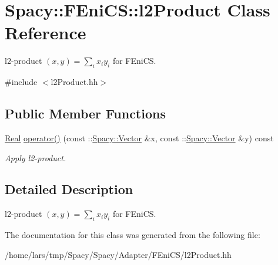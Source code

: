 \hypertarget{classSpacy_1_1FEniCS_1_1l2Product}{}\section{Spacy\+:\+:F\+Eni\+CS\+:\+:l2\+Product Class Reference}
\label{classSpacy_1_1FEniCS_1_1l2Product}


l2-\/product $(x,y) = \sum_i x_i y_i $ for F\+Eni\+CS.  




{\ttfamily \#include $<$l2\+Product.\+hh$>$}

\subsection*{Public Member Functions}
\begin{DoxyCompactItemize}
\item 
\hyperlink{classSpacy_1_1Real}{Real} \hyperlink{classSpacy_1_1FEniCS_1_1l2Product_a795fc0d8cbced556168163265ac21406}{operator()} (const \+::\hyperlink{classSpacy_1_1Vector}{Spacy\+::\+Vector} \&x, const \+::\hyperlink{classSpacy_1_1Vector}{Spacy\+::\+Vector} \&y) const \hypertarget{classSpacy_1_1FEniCS_1_1l2Product_a795fc0d8cbced556168163265ac21406}{}\label{classSpacy_1_1FEniCS_1_1l2Product_a795fc0d8cbced556168163265ac21406}

\begin{DoxyCompactList}\small\item\em Apply l2-\/product. \end{DoxyCompactList}\end{DoxyCompactItemize}


\subsection{Detailed Description}
l2-\/product $(x,y) = \sum_i x_i y_i $ for F\+Eni\+CS. 

The documentation for this class was generated from the following file\+:\begin{DoxyCompactItemize}
\item 
/home/lars/tmp/\+Spacy/\+Spacy/\+Adapter/\+F\+Eni\+C\+S/l2\+Product.\+hh\end{DoxyCompactItemize}
